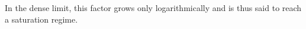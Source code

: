 In the dense limit, this factor grows only logarithmically and is thus said to reach a saturation regime.


